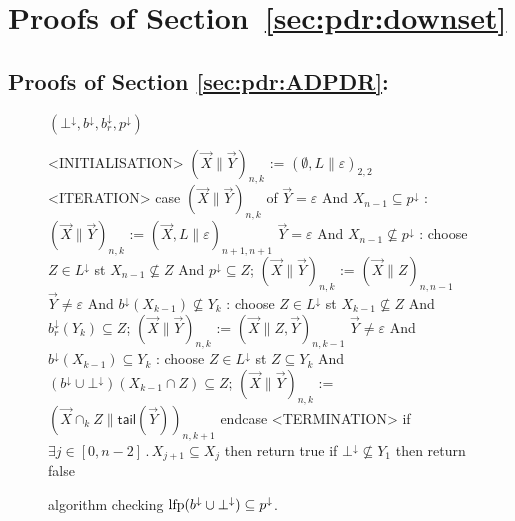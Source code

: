 \section{Proofs of Section~\ref{sec:pdr:downset}}
\subsection{Proofs of Section \ref{sec:pdr:ADPDR}: {\ADPDR}}

\begin{figure}[t]
	\centering
	\underline{{\APDR} $(\bot^\downarrow, b^\downarrow,b_r^{\downarrow}, p^{\downarrow})$}
	\begin{center}
		\small
		\begin{codeNT}
<INITIALISATION>
  $( \vec{X} \| \vec{Y} )_{n,k}$ := $(\emptyset,L\|\varepsilon)_{2,2}$
<ITERATION>
  case $( \vec{X} \| \vec{Y} )_{n,k}$ of
	   $\vec{Y}=\varepsilon$ And $X_{n-1} \subseteq p^{\downarrow}$     :                    %
			$( \vec{X} \| \vec{Y} )_{n,k}$ := $( \vec{X}, L \| \varepsilon )_{n+1,n+1}$
	   $\vec{Y}=\varepsilon$ And $X_{n-1} \not \subseteq p^{\downarrow}$    :                     %
			choose $Z\in L^{\downarrow}$ st  $X_{n-1} \not \subseteq Z$ And  $p^\downarrow \subseteq Z$;
			$( \vec{X} \| \vec{Y} )_{n,k}$ := $( \vec{X} \| Z )_{n,n-1}$
	   $\vec{Y} \neq \varepsilon$ And $b^\downarrow(X_{k-1}) \not \subseteq Y_k$ :                        %
			choose $Z \in L^\downarrow$ st $X_{k-1} \not \subseteq Z$ And $b_r^{\downarrow}(Y_k) \subseteq Z$;
			$(\vec{X} \| \vec{Y} )_{n,k}$ := $(\vec{X} \| Z , \vec{Y} )_{n,k-1}$
	   $\vec{Y} \neq \varepsilon$ And $b^\downarrow(X_{k-1}) \subseteq Y_k$ :                        %
			choose $Z \in L^\downarrow$ st $Z \subseteq Y_k$ And $(b^\downarrow \cup \bot^\downarrow)(X_{k-1} \cap Z) \subseteq Z$;
			$(\vec{X} \| \vec{Y} )_{n,k}$ := $(\vec{X} \cap_k Z \| \mathsf{tail}(\vec{Y}) )_{n,k+1}$
  endcase
<TERMINATION>
	if $\exists j\in [0,n-2]\,.\, X_{j+1} \subseteq X_j$ then return true		 %
	if $\bot^\downarrow \not \subseteq Y_1$ then return false							%
\end{codeNT}
	\end{center}
	\caption{{\APDR} algorithm checking $\text{lfp} (b^\downarrow \cup \bot^\downarrow) \subseteq p^\downarrow$.}
	\label{fig:app:APDRonDownset}
\end{figure}

